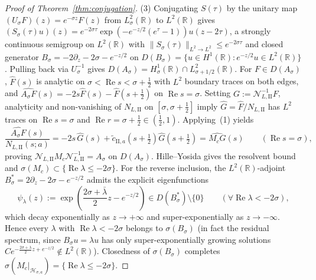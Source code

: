 \documentclass[11pt,a4paper]{article}
\begin{document}
\begin{proof}[Proof of Theorem~\ref{thm:conjugation}]
(3) Conjugating $S(\tau)$ by the unitary map $(U_\sigma F)(z) = e^{-\sigma z}F(z)$ from $L^2_\sigma(\mathbb{R})$ to $L^2(\mathbb{R})$ gives $(S_\sigma(\tau)u)(z) = e^{-2\sigma\tau}\exp(-e^{-z/2}(e^\tau - 1))u(z-2\tau)$, a strongly continuous semigroup on $L^2(\mathbb{R})$ with $\|S_\sigma(\tau)\|_{L^2\to L^2} \le e^{-2\sigma\tau}$ and closed generator $B_\sigma = -2\partial_z - 2\sigma - e^{-z/2}$ on $D(B_\sigma) = \{u \in H^1(\mathbb{R}) : e^{-z/2}u \in L^2(\mathbb{R})\}$. Pulling back via $U_\sigma^{-1}$ gives $D(A_\sigma) = H^1_\sigma(\mathbb{R}) \cap L^2_{\sigma+1/2}(\mathbb{R})$. For $F \in D(A_\sigma)$, $\widehat{F}(s)$ is analytic on $\sigma < \operatorname{Re} s < \sigma + \frac{1}{2}$ with $L^2$ boundary traces on both edges, and $\widehat{A_\sigma F}(s) = -2s\widehat{F}(s) - \widehat{F}(s+\frac{1}{2})$ on $\operatorname{Re} s = \sigma$. Setting $G := \mathcal{N}_{L,\mathrm{II}}^{-1} F$, analyticity and non-vanishing of $N_{L,\mathrm{II}}$ on $[\sigma,\sigma+\frac{1}{2}]$ imply $\widehat{G} = \widehat{F}/N_{L,\mathrm{II}}$ has $L^2$ traces on $\operatorname{Re} s = \sigma$ and $\operatorname{Re} r = \sigma + \frac{1}{2} \in (\frac{1}{2}, 1)$. Applying~(1) yields
\[
\frac{\widehat{A_\sigma F}(s)}{N_{L,\mathrm{II}}(s;a)} = -2s\,\widehat{G}(s) + \tilde c_{\mathrm{II},a}\!\left(s + \tfrac{1}{2}\right)\widehat{G}\!\left(s + \tfrac{1}{2}\right) = \widehat{M_c G}(s) \qquad (\operatorname{Re} s = \sigma),
\]
proving $\mathcal{N}_{L,\mathrm{II}} M_c \mathcal{N}_{L,\mathrm{II}}^{-1} = A_\sigma$ on $D(A_\sigma)$. Hille--Yosida gives the resolvent bound and $\sigma(M_c) \subset \{\operatorname{Re}\lambda \le -2\sigma\}$. For the reverse inclusion, the $L^2(\mathbb{R})$-adjoint $B_\sigma^* = 2\partial_z - 2\sigma - e^{-z/2}$ admits the explicit eigenfunctions
\[
\psi_\lambda(z) := \exp\!\left(\frac{2\sigma + \bar\lambda}{2}z - e^{-z/2}\right) \in D(B_\sigma^*)\setminus\{0\} \qquad (\forall \operatorname{Re}\lambda < -2\sigma),
\]
which decay exponentially as $z \to +\infty$ and super-exponentially as $z \to -\infty$. Hence every $\lambda$ with $\operatorname{Re}\lambda < -2\sigma$ belongs to $\sigma(B_\sigma)$ (in fact the residual spectrum, since $B_\sigma u = \lambda u$ has only super-exponentially growing solutions $C e^{-\frac{2\sigma+\lambda}{2}z + e^{-z/2}} \notin L^2(\mathbb{R})$). Closedness of $\sigma(B_\sigma)$ completes $\sigma(M_c|_{\mathcal{H}_{\sigma,a}}) = \{\operatorname{Re}\lambda \le -2\sigma\}$.
\end{proof}

\end{document}

